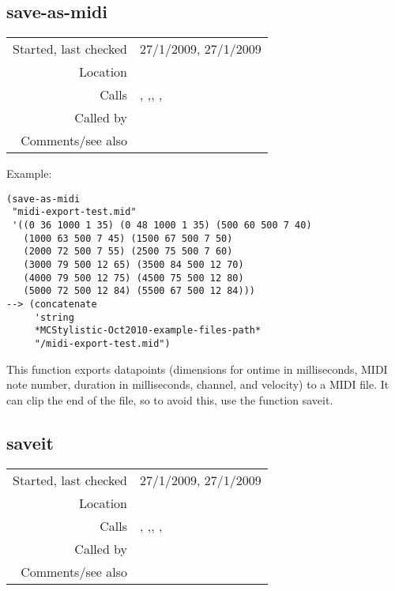 \subsection*{save-as-midi}\label{fun:save-as-midi}

\vspace{0.3cm}
\begin{tabular}{r|p{8cm}}
Started, last checked & 27/1/2009, 27/1/2009 \\
Location & \nameref{sec:MIDI-export} \\
Calls & \nameref{fun:create-midi-file}, \nameref{fun:create-midi-tracks},\newline \nameref{fun:create-MThd}, \nameref{fun:insert-program-changes},\newline \nameref{fun:write-to-midi-file} \\
Called by & \\
Comments/see also & \nameref{fun:saveit}
\end{tabular}

\vspace{0.5cm}
\noindent Example:
\begin{verbatim}
(save-as-midi
 "midi-export-test.mid"
 '((0 36 1000 1 35) (0 48 1000 1 35) (500 60 500 7 40)
   (1000 63 500 7 45) (1500 67 500 7 50)
   (2000 72 500 7 55) (2500 75 500 7 60)
   (3000 79 500 12 65) (3500 84 500 12 70)
   (4000 79 500 12 75) (4500 75 500 12 80)
   (5000 72 500 12 84) (5500 67 500 12 84)))
--> (concatenate
     'string
     *MCStylistic-Oct2010-example-files-path*
     "/midi-export-test.mid")
\end{verbatim}

\noindent This function exports datapoints (dimensions
for ontime in milliseconds, MIDI note number, duration
in milliseconds, channel, and velocity) to a MIDI
file. It can clip the end of the file, so to avoid
this, use the function saveit.


\subsection*{saveit}\label{fun:saveit}

\vspace{0.3cm}
\begin{tabular}{r|p{8cm}}
Started, last checked & 27/1/2009, 27/1/2009 \\
Location & \nameref{sec:MIDI-export} \\
Calls & \nameref{fun:create-midi-file}, \nameref{fun:create-midi-tracks},\newline \nameref{fun:create-MThd}, \nameref{fun:insert-program-changes},\newline \nameref{fun:write-to-midi-file} \\
Called by & \\
Comments/see also & \nameref{fun:save-as-midi}
\end{tabular}

